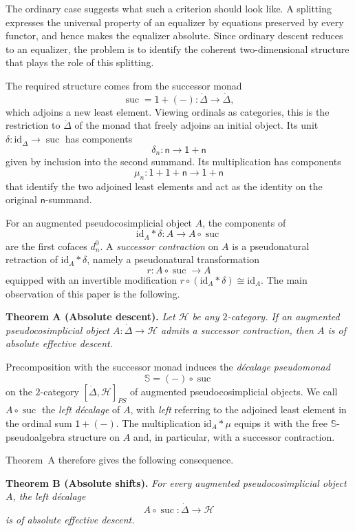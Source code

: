 \documentclass[11pt,a4paper]{article}
\numberwithin{equation}{section}
\theoremstyle{definition}
\theoremstyle{remark}
\newcommand{\id}{\mathrm{id}}
\newcommand{\Hcat}{\mathcal H}
\newcommand{\suc}{\operatorname{suc}}
\newcommand{\Smon}{\mathbb S}
\begin{document}
The ordinary case suggests what such a criterion should look like.
A splitting expresses the universal property of an equalizer by
equations preserved by every functor, and hence makes the equalizer
absolute. Since ordinary descent reduces to an equalizer, the problem
is to identify the coherent two-dimensional structure that plays the
role of this splitting.

The required structure comes from the successor monad
\[
\suc=\mathsf{1}+(-)\colon\dot\Delta\longrightarrow\dot\Delta,
\]
which adjoins a new least element. Viewing ordinals as categories,
this is the restriction to \(\dot\Delta\) of the monad that freely
adjoins an initial object. Its unit
\(\delta\colon\id_{\dot\Delta}\to\suc\) has components
\[
\delta_n\colon\mathsf n\longrightarrow\mathsf1+\mathsf n
\]
given by inclusion into the second summand. Its multiplication has
components
\[
\mu_n\colon\mathsf1+\mathsf1+\mathsf n
\longrightarrow\mathsf1+\mathsf n
\]
that identify the two adjoined least elements and act as the identity
on the original \(\mathsf n\)-summand.

For an augmented pseudocosimplicial object \(A\), the components of
\[
\id_A\ast\delta\colon A\longrightarrow A\circ\suc
\]
are the first cofaces \(d_n^0\). A \emph{successor contraction} on
\(A\) is a pseudonatural retraction of \(\id_A\ast\delta\), namely a
pseudonatural transformation
\[
r\colon A\circ\suc\longrightarrow A
\]
equipped with an invertible modification \(r\circ(\id_A\ast\delta)\cong\id_A\).
The main observation of this paper is the following.

\medskip
\noindent\textbf{Theorem A (Absolute descent).}
\emph{Let \(\Hcat\) be any \(2\)-category. If an augmented
	pseudocosimplicial object \(A\colon\dot\Delta\to\Hcat\) admits a
	successor contraction, then \(A\) is of absolute effective descent.}
\medskip

Precomposition with the successor monad induces the
\textit{d\'ecalage pseudomonad}
\[
\Smon=(-)\circ\suc
\]
on the \(2\)-category \([\dot\Delta,\Hcat]_{PS}\) of augmented
pseudocosimplicial objects. We call \(A\circ\suc\) the
\emph{left d\'ecalage} of \(A\), with \emph{left} referring to the
adjoined least element in the ordinal sum \(\mathsf1+(-)\).
The multiplication \(\id_A\ast\mu\) equips it with the free
\(\Smon\)-pseudoalgebra structure on \(A\) and, in particular,
with a successor contraction.

Theorem~A therefore gives the following consequence.

\medskip
\noindent\textbf{Theorem B (Absolute shifts).}
\emph{For every augmented pseudocosimplicial object \(A\),
	the left d\'ecalage
	\[
	A\circ\suc\colon\dot\Delta\longrightarrow\Hcat
	\]
	is of absolute effective descent.}
\medskip
\end{document}
